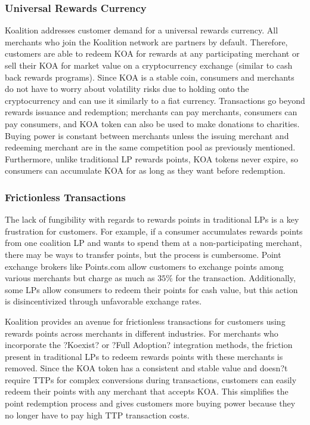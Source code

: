 \subsubsection{Universal Rewards Currency}
Koalition addresses customer demand for a universal rewards currency. All merchants who join the Koalition network are partners by default. Therefore, customers are able to redeem KOA for rewards at any participating merchant or sell their KOA for market value on a cryptocurrency exchange (similar to cash back rewards programs). Since KOA is a stable coin, consumers and merchants do not have to worry about volatility risks due to holding onto the cryptocurrency and can use it similarly to a fiat currency. Transactions go beyond rewards issuance and redemption; merchants can pay merchants, consumers can pay consumers, and KOA token can also be used to make donations to charities. Buying power is constant between merchants unless the issuing merchant and redeeming merchant are in the same competition pool as previously mentioned. Furthermore, unlike traditional LP rewards points, KOA tokens never expire, so consumers can accumulate KOA for as long as they want before redemption.

\subsubsection{Frictionless Transactions}
The lack of fungibility with regards to rewards points in traditional LPs is a key frustration for customers. For example, if a consumer accumulates rewards points from one coalition LP and wants to spend them at a non-participating merchant, there may be ways to transfer points, but the process is cumbersome. Point exchange brokers like Points.com allow customers to exchange points among various merchants but charge as much as $35\%$ for the transaction. Additionally, some LPs allow consumers to redeem their points for cash value, but this action is disincentivized through unfavorable exchange rates.

Koalition provides an avenue for frictionless transactions for customers using rewards points across merchants in different industries. For merchants who incorporate the ?Koexist? or ?Full Adoption? integration methods, the friction present in traditional LPs to redeem rewards points with these merchants is removed. Since the KOA token has a consistent and stable value and doesn?t require TTPs for complex conversions during transactions, customers can easily redeem their points with any merchant that accepts KOA. This simplifies the point redemption process and gives customers more buying power because they no longer have to pay high TTP transaction costs. 

